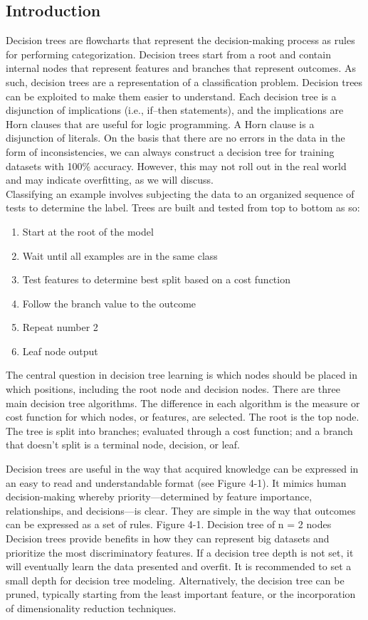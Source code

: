 \documentclass[12pt]{article}
\begin{document}
\subsection{Introduction}
Decision trees are flowcharts that represent the decision-making process as rules for performing categorization. Decision trees start from a root and contain internal nodes that represent features and branches that represent outcomes. As such, decision trees are a representation of a classification problem. Decision trees can be exploited to make them easier to understand. Each decision tree is a disjunction of implications (i.e., if–then statements), and the implications are Horn clauses that are useful for logic
programming. A Horn clause is a disjunction of literals.
On the basis that there are no errors in the data in the form of inconsistencies, we can always construct a decision tree for training datasets with 100\% accuracy. However, this may not roll out in the real world and may indicate overfitting, as we will discuss.
\\
Classifying an example involves subjecting the data to an organized sequence of tests to determine the label. Trees are built and tested from top to bottom as so:
\begin{enumerate}
\item Start at the root of the model
\item Wait until all examples are in the same class
\item Test features to determine best split based on a cost function
\item Follow the branch value to the outcome
\item Repeat number 2
\item Leaf node output
\end{enumerate}

The central question in decision tree learning is which nodes should be placed in which positions, including the root node and decision nodes. There are three main decision tree algorithms. The difference in each algorithm is the measure or cost function for which nodes, or features, are selected. The root is the top node. The tree is split into branches; evaluated through a cost function; and a branch that doesn’t split is a terminal node, decision, or leaf.

Decision trees are useful in the way that acquired knowledge can be expressed in an easy to read and understandable format (see Figure 4-1). It mimics human decision-making whereby priority—determined by feature importance, relationships, and decisions—is clear. They are simple in the way that outcomes can be expressed as a set of rules. Figure 4-1. Decision tree of n = 2 nodes
Decision trees provide benefits in how they can represent big datasets and prioritize the most discriminatory features. If a decision tree depth is not set, it will eventually learn the data presented and overfit. It is recommended to set a small depth for decision tree modeling. Alternatively, the decision tree can be pruned, typically starting from the least important feature, or the incorporation of dimensionality reduction techniques.
\end{document}
